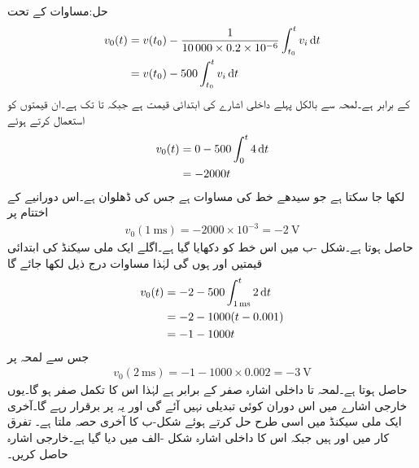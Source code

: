 حل:مساوات  کے تحت
\begin{align*}
v_0(t)&=v(t_0)-\frac{1}{\num{10000}\times 0.2\times 10^{-6} }\int_{t_0}^{t}v_i \dif t\\
&=v(t_0)-500\int_{t_0}^{t}v_i \dif t
\end{align*}
کے برابر ہے۔لمحہ  سے بالکل پہلے داخلی اشارے کی ابتدائی قیمت  ہے جبکہ  تا  تک  ہے۔ان قیمتوں کو استعمال کرتے ہوئے
\begin{align*}
v_0(t)&=0-500\int_0^{t} 4 \dif t\\
&=-2000 t
\end{align*}
لکھا جا سکتا ہے جو سیدھے خط کی مساوات ہے جس کی ڈھلوان  ہے۔اس دورانیے کے اختتام  پر
\begin{align*}
v_0(\SI{1}{\milli\second})=-2000 \times 10^{-3}=\SI{-2}{\volt}
\end{align*}
حاصل ہوتا ہے۔شکل -ب میں اس خط کو دکھایا گیا ہے۔اگلے ایک ملی سیکنڈ کی ابتدائی قیمتیں  اور  ہوں گی لہٰذا مساوات  درج ذیل لکھا جائے گا
\begin{align*}
v_0(t)&=-2-500\int_{\SI{1}{\milli\second}}^t 2\dif t\\
&=-2-1000(t-0.001)\\
&=-1-1000t
\end{align*}
جس سے  لمحہ  پر
\begin{align*}
v_0(\SI{2}{\milli\second})=-1-1000\times 0.002=\SI{-3}{\volt}
\end{align*}
حاصل ہوتا ہے۔لمحہ  تا  داخلی اشارہ صفر کے برابر ہے لہٰذا اس کا تکمل صفر ہو گا۔یوں خارجی اشارے میں اس دوران کوئی تبدیلی نہیں آئے گی اور یہ  پر برقرار رہے گا۔آخری ایک ملی سیکنڈ میں اسی طرح حل کرتے ہوئے شکل-ب کا آخری حصہ ملتا ہے۔ 
تفرق کار میں  اور  ہیں جبکہ اس کا داخلی اشارہ شکل -الف میں دیا گیا ہے۔خارجی اشارہ حاصل کریں۔

